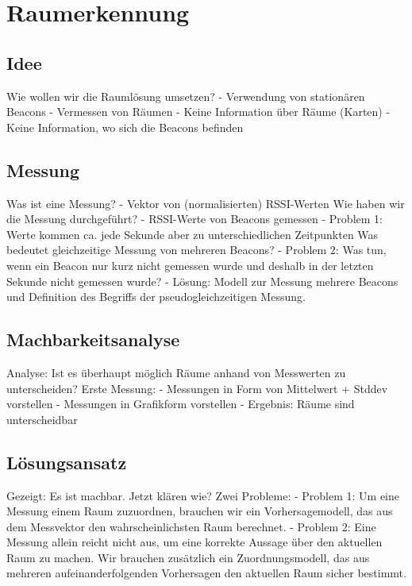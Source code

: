 \section{Raumerkennung}

\subsection{Idee}

Wie wollen wir die Raumlösung umsetzen?
- Verwendung von stationären Beacons
- Vermessen von Räumen
- Keine Information über Räume (Karten)
- Keine Information, wo sich die Beacons befinden

\subsection{Messung}

Was ist eine Messung?
- Vektor von (normalisierten) RSSI-Werten
Wie haben wir die Messung durchgeführt?
- RSSI-Werte von Beacons gemessen
- Problem 1: Werte kommen ca. jede Sekunde aber zu unterschiedlichen Zeitpunkten
  Was bedeutet gleichzeitige Messung von mehreren Beacons?
- Problem 2: Was tun, wenn ein Beacon nur kurz nicht gemessen wurde und deshalb
  in der letzten Sekunde nicht gemessen wurde?
- Lösung: Modell zur Messung mehrere Beacons und Definition des Begriffs der
  pseudogleichzeitigen Messung.

\subsection{Machbarkeitsanalyse}

Analyse: Ist es überhaupt möglich Räume anhand von Messwerten zu unterscheiden?
Erste Messung:
- Messungen in Form von Mittelwert + Stddev vorstellen
- Messungen in Grafikform vorstellen
- Ergebnis: Räume sind unterscheidbar

\subsection{Lösungsansatz}

Gezeigt: Es ist machbar. Jetzt klären wie?
Zwei Probleme:
- Problem 1: Um eine Messung einem Raum zuzuordnen, brauchen wir ein Vorhersagemodell,
  das aus dem Messvektor den wahrscheinlichsten Raum berechnet.
- Problem 2: Eine Messung allein reicht nicht aus, um eine korrekte Aussage über
  den aktuellen Raum zu machen. Wir brauchen zusätzlich ein Zuordnungsmodell,
  das aus mehreren aufeinanderfolgenden Vorhersagen den aktuellen Raum sicher
  bestimmt.
  
